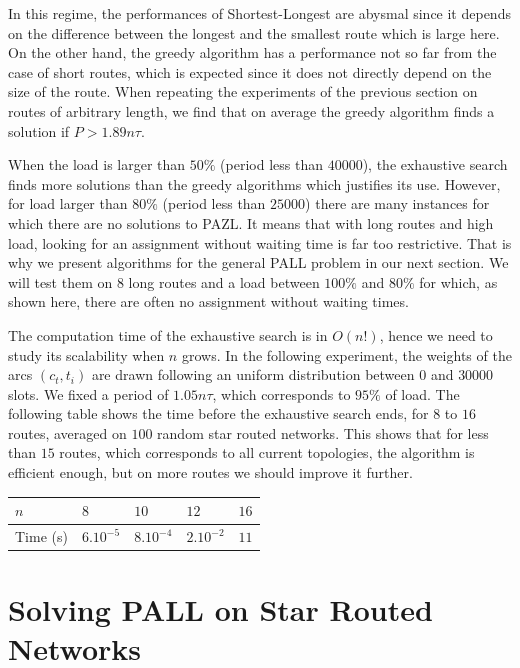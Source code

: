 \documentclass[10pt, conference, letterpaper]{IEEEtran}
\begin{document}
      In this regime, the performances of Shortest-Longest are abysmal since it depends on the difference between the longest and the smallest route which is large here. On the other hand, the greedy algorithm has a performance not so far from the case of short routes, which is expected since it does not directly depend on the size of the route. When repeating the experiments of the previous section on routes of arbitrary length, we find that on average the greedy algorithm finds a solution if $P>1.89n\tau$.
      
      When the load is larger than $50\%$ (period less than $40000$), the exhaustive search finds  more solutions than the greedy algorithms which justifies its use. However, for load larger than $80\%$ (period less than $25000$) there are many instances for which there are no solutions to PAZL.
      It means that with long routes and high load, looking for an assignment without waiting time is far too restrictive. That is why we present algorithms for the general PALL problem in our next section. We will test them on $8$ long routes and a load between $100\%$ and $80\%$ for which, as shown here, there are often no assignment without waiting times.
      
      The computation time of the exhaustive search is in $O(n!)$, hence we need to study its scalability when $n$ grows. In the following experiment, the weights of the arcs $(c_t,t_i)$ are drawn following an uniform distribution between $0$ and $30000$ slots. We fixed a period of $1.05n\tau$, which corresponds to $95\%$ of load.
      The following table shows the time before the exhaustive search ends, for $8$ to $16$ routes, averaged on $100$ random star routed networks. This shows that for less than $15$ routes, which corresponds to all current topologies, the algorithm is efficient enough, but on more routes we should improve it further.
         \begin{center}
         \begin{tabularx}{0.5\textwidth}{|l|X|X|X|X|}
    \hline
   $n$ & $8$ & $10$& $12$& $16$\\
    \hline
   Time (s) & $6.10^{-5}$&$8.10^{-4}$&$2.10^{-2}$& $11$\\
    \hline
      \end{tabularx}
      \end{center}
      
         \section{Solving PALL on Star Routed Networks}\label{sec:PALL}
    
\end{document}
